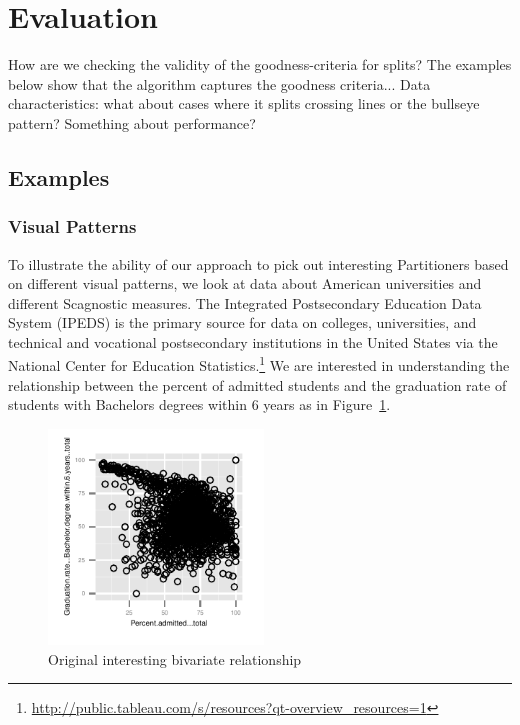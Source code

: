 \section{Evaluation}
\label{sec:evaluation}
How are we checking the validity of the goodness-criteria for splits? The examples below show that the algorithm captures the goodness criteria...
Data characteristics: what about cases where it splits crossing lines or the bullseye pattern?
Something about performance?

\subsection{Examples}
\subsubsection{Visual Patterns}
To illustrate the ability of our approach to pick out interesting Partitioners based on different visual patterns, we look at data about American universities and different Scagnostic measures. The Integrated Postsecondary Education Data System (IPEDS) is the primary source for data on colleges, universities, and technical and vocational postsecondary institutions in the United States via the National Center for Education Statistics.\footnote{\url{http://public.tableau.com/s/resources?qt-overview_resources=1}} We are interested in understanding the relationship between the percent of admitted students and the graduation rate of students with Bachelors degrees within $6$ years as in Figure~\ref{fig:original1}. 
\begin{figure}
 \centering 
\includegraphics[width=2.25in,height=2.25in]{images/original1.pdf}
  \caption{Original interesting bivariate relationship}
 \label{fig:original1}
\end{figure}

